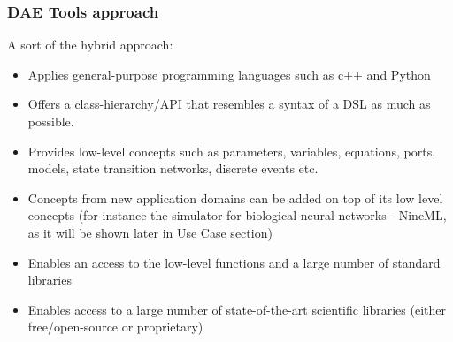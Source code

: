 \documentclass{beamer}
\begin{document}
\begin{frame}
\frametitle{DAE Tools approach}
\begin{block}{}
A sort of the hybrid approach:
\begin{itemize}
  \item Applies general-purpose programming languages such as c++ and Python
  \item Offers a class-hierarchy/API that resembles a syntax of a DSL as much as possible. 
  \item Provides low-level concepts such as parameters, variables, equations, ports, models, state transition networks, discrete events etc.
  \item Concepts from new application domains can be added on top of its low level concepts (for instance the simulator for biological neural networks - NineML, as it will be shown later in Use Case section)
  \item Enables an access to the low-level functions and a large number of standard libraries
  \item Enables access to a large number of state-of-the-art scientific libraries (either free/open-source or proprietary)
\end{itemize}
\end{block}
\end{frame}
\end{document}
